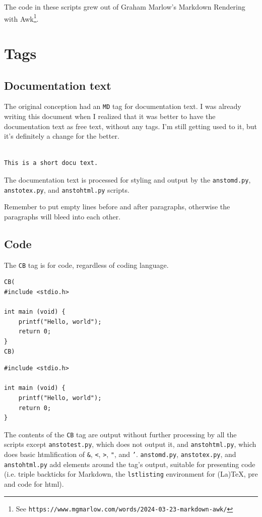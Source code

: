 The code in these scripts grew out of Graham Marlow's Markdown Rendering with Awk\footnote{See \texttt{https://www.mgmarlow.com/words/2024-03-23-markdown-awk/}}.

\chapter{Tags}
\label{tags}

\section{Documentation text}
\label{documentation-text}

The original conception had an \texttt{MD} tag for documentation text. I was already writing this document when I realized that it was better to have the documentation text as free text, without any tags. I'm still getting used to it, but it's definitely a change for the better.

\begin{verbatim}

This is a short docu text.

\end{verbatim}

The documentation text is processed for styling and output by the \texttt{anstomd.py}, \texttt{anstotex.py}, and \texttt{anstohtml.py} scripts.

Remember to put empty lines before and after paragraphs, otherwise the paragraphs will bleed into each other.

\section{Code}
\label{code}

The \texttt{CB} tag is for code, regardless of coding language.

\begin{verbatim}
CB(
#include <stdio.h>

int main (void) {
    printf("Hello, world");
    return 0;
}
CB)
\end{verbatim}

\begin{lstlisting}
#include <stdio.h>

int main (void) {
    printf("Hello, world");
    return 0;
}
\end{lstlisting}

The contents of the \texttt{CB} tag are output without further processing by all the scripts except \texttt{anstotest.py}, which does not output it, and \texttt{anstohtml.py}, which does basic htmlification of \texttt{\&}, \texttt{<}, \texttt{>}, \texttt{"}, and \texttt{'}. \texttt{anstomd.py}, \texttt{anstotex.py}, and \texttt{anstohtml.py} add elements around the tag's output, suitable for presenting code (i.e. triple backticks for Markdown, the \texttt{lstlisting} environment for (La)TeX, pre and code for html).


